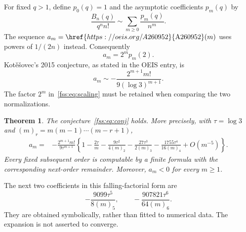 \documentclass[11pt]{article}
\newtheorem{theorem}{Theorem}
\newcommand{\fall}[2]{(#1)_{#2}}
\begin{document}
For fixed $q>1$, define $p_0(q)=1$ and the asymptotic coefficients $p_m(q)$ by
\begin{equation}\label{fss:eq:pdef}
 \frac{B_n(q)}{q^n n!}\sim\sum_{m\ge0}\frac{p_m(q)}{n^m}.
\end{equation}
The sequence $a_m=\href{https://oeis.org/A260952}{\mathrm{A260952}}(m)$ uses powers of $1/(2n)$ instead. Consequently
\begin{equation}\label{fss:eq:scaling}
 a_m=2^m p_m(2).
\end{equation}
Kot\v e\v sovec's 2015 conjecture, as stated in the OEIS entry, is
\begin{equation}\label{fss:eq:conj}
 a_m\sim-\frac{2^{m+1}m!}{9(\log3)^{m+1}}.
\end{equation}
The factor $2^m$ in~\eqref{fss:eq:scaling} must be retained when comparing the two normalizations.

\begin{theorem}\label{fss:thm:main}
The conjecture~\eqref{fss:eq:conj} holds. More precisely, with $\tau=\log3$ and $\fall mr=m(m-1)\cdots(m-r+1)$,
\begin{align}\label{fss:eq:main}
 a_m={}&-\frac{2^{m+1}m!}{9\tau^{m+1}}
 \left\{1-\frac{2\tau}{m}-\frac{9\tau^2}{4\fall m2}
 -\frac{27\tau^3}{2\fall m3}-\frac{1755\tau^4}{16\fall m4}
 +O(m^{-5})\right\}.
\end{align}
Every fixed subsequent order is computable by a finite formula with the corresponding next-order remainder. Moreover, $a_m<0$ for every $m\ge1$.
\end{theorem}
The next two coefficients in this falling-factorial form are
\[
 -\frac{9099\tau^5}{8\fall m5},\qquad
 -\frac{907821\tau^6}{64\fall m6}.
\]
They are obtained symbolically, rather than fitted to numerical data. The expansion is not asserted to converge.
\end{document}
